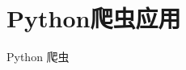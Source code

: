 \documentclass[../main.tex]{subfiles}
\begin{document}
\chapter{Python爬虫应用}
Python 爬虫
\end{document}
